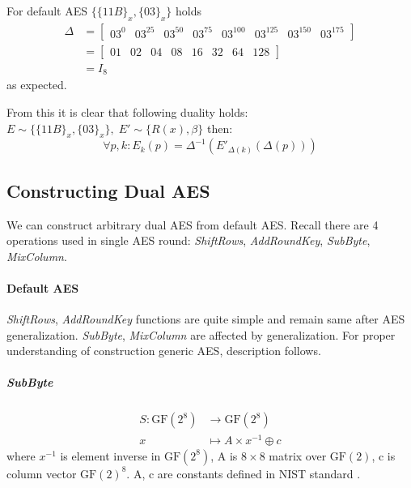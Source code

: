 \documentclass[11pt,oneside,final]{fithesis2}
\newcommand{\gfe}{\ensuremath{\text{GF}\left(2^8\right)}}
\begin{document}
	For default AES $\{\{11B\}_x, \{03\}_x\}$ holds
	\begin{align*}
	    \Delta &= \begin{bmatrix} 03^0 & 03^{25} & 03^{50} & 03^{75} & 03^{100} & 03^{125} & 03^{150} & 03^{175}  \end{bmatrix} \\
	           &= \begin{bmatrix} 01 & 02 & 04 & 08 & 16 & 32 & 64 & 128 \end{bmatrix} \\
		   &= I_8
	\end{align*}
	as expected.

	From this it is clear that following duality holds: $E \sim \{\{11B\}_x, \{03\}_x\}, \; E' \sim \{R(x), \beta \}$ then:
	\begin{equation} 
	\forall p, k: E_k(p) = \Delta^{-1}\left(E'_{\Delta(k)}(\Delta(p))\right)
	\end{equation}

	\subsection{Constructing Dual AES}
	We can construct arbitrary dual AES from default AES. Recall there are 4 operations used in single AES round: \emph{ShiftRows}, \emph{AddRoundKey}, \emph{SubByte}, \emph{MixColumn}.

	\paragraph*{Default AES}
	\emph{ShiftRows}, \emph{AddRoundKey} functions are quite simple and remain same after AES generalization. \emph{SubByte}, \emph{MixColumn} are affected by 
	generalization. For proper understanding of construction generic AES, description follows.

	\subparagraph*{SubByte}\label{sec:aes_subbyte}
	\begin{equation}
	\begin{aligned}
	S: \gfe         & \longrightarrow  \gfe\\
	x               & \longmapsto A \times x^{-1} \oplus c
	\end{aligned}
	\end{equation}
	where $x^{-1}$ is element inverse in $\gfe$, A is $8 \times 8$ matrix over $\text{GF}(2)$, c is column vector $\text{GF}(2)^8$. A, c are constants defined in NIST standard \citep{AES-FIPS}.
\end{document}
